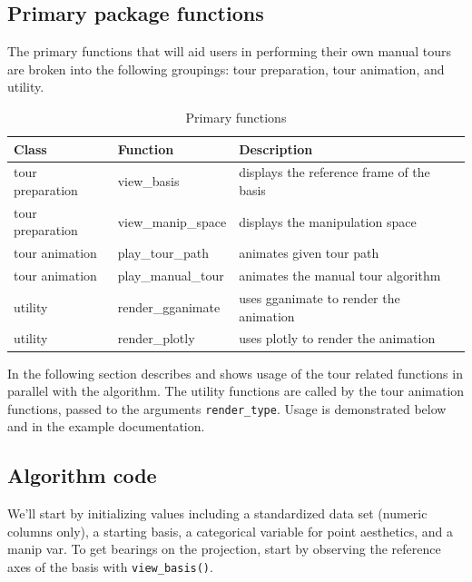 \hypertarget{primary-package-functions}{%
\subsection{Primary package functions}\label{primary-package-functions}}

The primary functions that will aid users in performing their own manual
tours are broken into the following groupings: tour preparation, tour
animation, and utility.

\begin{Schunk}
\begin{table}[t]

\caption{\label{tab:functionsTable}Primary functions}
\centering
\begin{tabular}{lll}
\toprule
Class & Function & Description\\
\midrule
tour preparation & view\_basis & displays the reference frame of the basis\\
tour preparation & view\_manip\_space & displays the manipulation space\\
tour animation & play\_tour\_path & animates given tour path\\
tour animation & play\_manual\_tour & animates the manual tour algorithm\\
utility & render\_gganimate & uses gganimate to render the animation\\
\addlinespace
utility & render\_plotly & uses plotly to render the animation\\
\bottomrule
\end{tabular}
\end{table}

\end{Schunk}

In the following section describes and shows usage of the tour related
functions in parallel with the algorithm. The utility functions are
called by the tour animation functions, passed to the arguments
\texttt{render\_type}. Usage is demonstrated below and in the example
documentation.

\hypertarget{algorithm-code}{%
\subsection{Algorithm code}\label{algorithm-code}}

We'll start by initializing values including a standardized data set
(numeric columns only), a starting basis, a categorical variable for
point aesthetics, and a manip var. To get bearings on the projection,
start by observing the reference axes of the basis with
\texttt{view\_basis()}.


